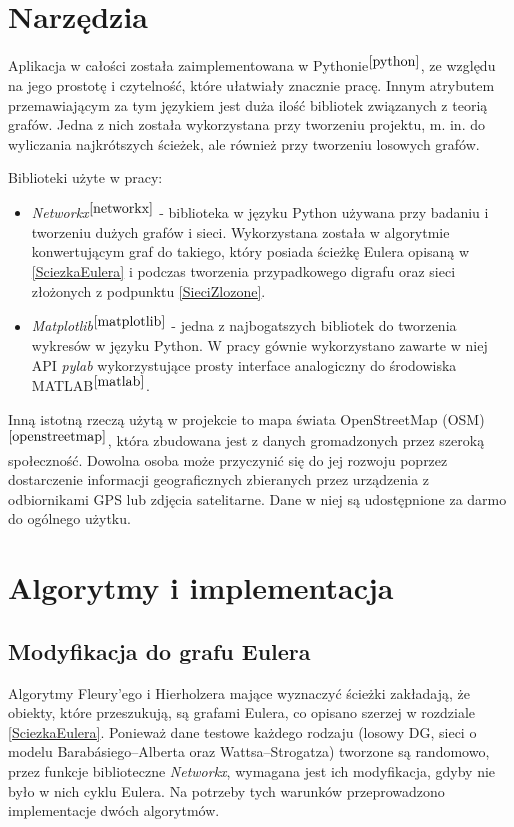 \documentclass[a4paper, 12pt, twoside, openright]{article}
\begin{document}
\newpage
\section{Narzędzia} \label{narzedzia}

\indent\par
	Aplikacja w całości została zaimplementowana w Pythonie$^{\cite{python}}$, ze względu na jego prostotę i czytelność, które ułatwiały znacznie pracę. Innym atrybutem przemawiającym za tym językiem jest duża ilość bibliotek związanych z teorią grafów. Jedna z nich została wykorzystana przy tworzeniu projektu, m. in. do wyliczania najkrótszych ścieżek, ale również przy tworzeniu losowych grafów.

	Biblioteki użyte w pracy:
	\begin{itemize}
		\item \textit{Networkx}$^{\cite{networkx}}$ - biblioteka w języku Python używana przy badaniu i tworzeniu dużych grafów i sieci. Wykorzystana została w algorytmie konwertującym graf do takiego, który posiada ścieżkę Eulera opisaną w \ref{SciezkaEulera} i podczas tworzenia przypadkowego digrafu oraz sieci złożonych z podpunktu \ref{SieciZlozone}.
		\item \textit{Matplotlib}$^{\cite{matplotlib}}$ - jedna z najbogatszych bibliotek do tworzenia wykresów w języku Python. W pracy gównie wykorzystano zawarte w niej API \textit{pylab} wykorzystujące prosty interface analogiczny do środowiska MATLAB$^{\cite{matlab}}$.
	\end{itemize}

	Inną istotną rzeczą użytą w projekcie to mapa świata OpenStreetMap (OSM)$^{\cite{openstreetmap}}$, która zbudowana jest z danych gromadzonych przez szeroką społeczność. Dowolna osoba może przyczynić się do jej rozwoju poprzez dostarczenie informacji geograficznych zbieranych przez urządzenia z odbiornikami GPS lub zdjęcia satelitarne. Dane w niej są udostępnione za darmo do ogólnego użytku.




\newpage
\section{Algorytmy i implementacja}

\subsection{Modyfikacja do grafu Eulera}
\indent\par
	Algorytmy Fleury’ego i Hierholzera mające wyznaczyć ścieżki zakładają, że obiekty, które przeszukują, są grafami Eulera, co opisano szerzej w rozdziale \ref{SciezkaEulera}. Ponieważ dane testowe każdego rodzaju (losowy DG, sieci o modelu Barabásiego–Alberta oraz Wattsa–Strogatza) tworzone są randomowo, przez funkcje biblioteczne \textit{Networkx}, wymagana jest ich modyfikacja, gdyby nie było w nich cyklu Eulera. Na potrzeby tych warunków przeprowadzono implementacje dwóch algorytmów. 
	
\end{document}
